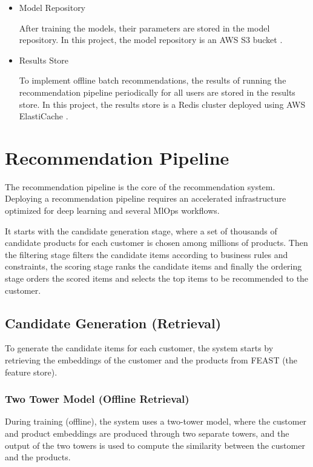 \begin{itemize}
    \item Model Repository
    \begin{displayquote}
        After training the models, their parameters are stored in the model repository. In this project, the model repository is an AWS S3 bucket \cite{AwsS3}. 
    \end{displayquote}
    \item Results Store
    \begin{displayquote}
       To implement offline batch recommendations, the results of running the recommendation pipeline periodically for all users are stored in the results store. 
       In this project, the results store is a Redis cluster deployed using AWS ElastiCache \cite{AwsElastiCache}.
    \end{displayquote}
\end{itemize}

\section{Recommendation Pipeline}

The recommendation pipeline is the core of the recommendation system.
Deploying a recommendation pipeline requires an accelerated infrastructure optimized for deep learning and several MlOps workflows.

It starts with the candidate generation stage, where a set of thousands of candidate products for each customer is chosen among millions of products.
Then the filtering stage filters the candidate items according to business rules and constraints, the scoring stage ranks the candidate items and finally the ordering stage orders 
the scored items and selects the top items to be recommended to the customer.

\subsection{Candidate Generation (Retrieval)}

To generate the candidate items for each customer, the system starts by retrieving the embeddings of the customer and the products from FEAST (the feature store).

\subsubsection{Two Tower Model (Offline Retrieval)}

During training (offline), the system uses a two-tower model, where the customer and product embeddings are produced through two separate towers, 
and the output of the two towers is used to compute the similarity between the customer and the products.

